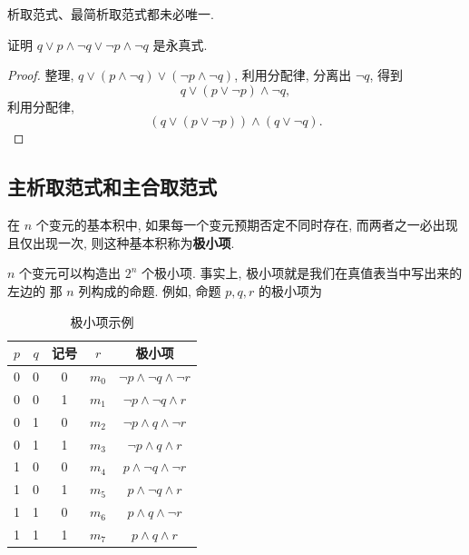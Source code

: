 \documentclass[10pt,UTF8]{book} %
\begin{document}
\begin{remark}
    析取范式、最简析取范式都未必唯一.
\end{remark}

\begin{example}
    证明 $q \vee p \wedge \lnot q \vee \lnot p \wedge \lnot q$ 是永真式.
    \begin{proof}
        整理, $q \vee (p \wedge \lnot q) \vee (\lnot p \wedge \lnot q)$,
        利用分配律, 分离出 $\lnot q$, 得到
        \[ q \vee (p \vee \lnot p) \wedge \lnot q, \]
        利用分配律,
        \[ (q \vee (p \vee \lnot p)) \wedge (q \vee \lnot q). \]
    \end{proof}
\end{example}

\subsection{主析取范式和主合取范式}

\begin{definition}
    在 $n$ 个变元的基本积中, 如果每一个变元预期否定不同时存在, 而两者之一必出现
    且仅出现一次, 则这种基本积称为\textbf{极小项}.
\end{definition}

$n$ 个变元可以构造出 $2^n$ 个极小项. 事实上, 极小项就是我们在真值表当中写出来的左边的
那 $n$ 列构成的命题. 例如, 命题 $p,q,r$ 的极小项为
\begin{table}[H]
    \centering
    \caption{极小项示例}
    \begin{tabular}{ccccc}
        \hline 
        $p$ & $q$ & 记号 & $r$ & 极小项 \\ 
        \hline
        0 & 0 & 0 & $m_0$ & $\lnot p \wedge \lnot q \wedge \lnot r$ \\ 
        0 & 0 & 1 & $m_1$ & $\lnot p \wedge \lnot q \wedge  r$\\ 
        0 & 1 & 0 & $m_2$ & $\lnot p \wedge  q \wedge \lnot r$\\ 
        0 & 1 & 1 & $m_3$ & $\lnot p \wedge  q \wedge  r$\\ 
        1 & 0 & 0 & $m_4$ & $ p \wedge \lnot q \wedge \lnot r$\\ 
        1 & 0 & 1 & $m_5$ & $ p \wedge \lnot q \wedge  r$\\ 
        1 & 1 & 0 & $m_6$ & $ p \wedge  q \wedge \lnot r$\\ 
        1 & 1 & 1 & $m_7$ & $ p \wedge  q \wedge  r$\\
        \hline
    \end{tabular}
\end{table}
\end{document}
